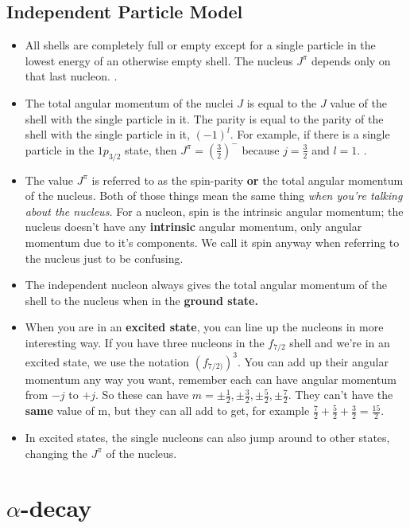 \documentclass[letter]{article}
\begin{document}
\subsection*{Independent Particle Model}
\begin{itemize}
\item All shells are completely full or empty except for a single
  particle in the lowest energy of an otherwise empty shell. The
  nucleus $J^\pi$ depends only on that last
  nucleon. \cite[Lec. 13-16]{lecture}.
\item The total angular momentum of the nuclei $J$ is equal to the
  $J$ value of the shell with the single particle in it. The parity
  is equal to the parity of the shell with the single particle in it,
  $(-1)^l$. For example, if there is a single particle in the
  $1p_{3/2}$ state, then $J^\pi=(\frac{3}{2})^{-}$ because
  $j=\frac{3}{2}$ and $l=1$. \cite[Lec. 13-16]{lecture}.
\item The value $J^\pi$ is referred to as the spin-parity \textbf{or}
  the total angular momentum of the nucleus. Both of those
  things mean the same thing \textit{when you're talking about the
    nucleus.} For a nucleon, spin is the intrinsic angular momentum;
  the nucleus doesn't have any \textbf{intrinsic} angular momentum,
  only angular momentum due to it's components. We call it spin anyway
  when referring to the nucleus just to be confusing.
\item The independent nucleon always gives the total angular momentum
  of the shell to the nucleus when in the \textbf{ground state.}
\item When you are in an \textbf{excited state}, you can line up the
  nucleons in more interesting way. If you have three nucleons in the
  $f_{7/2}$ shell and we're in an excited state, we use the notation
  $(f_{7/2)})^3$. You can add up their angular momentum any way you
  want, remember each can have angular momentum from $-j$ to $+j$. So
  these can have $m=\pm\frac{1}{2}, \pm\frac{3}{2}, \pm\frac{5}{2},
  \pm\frac{7}{2}$. They can't have the \textbf{same} value of m, but
  they can all add to get, for example
  $\frac{7}{2}+\frac{5}{2}+\frac{3}{2}=\frac{15}{2}$.~\cite[pp. 149-151]{krane}
\item In excited states, the single nucleons can also jump around to
  other states, changing the $J^\pi$ of the nucleus.~\cite[Lec. 13-16]{lecture}
\end{itemize}

\section*{$\alpha$-decay}
\end{document}

